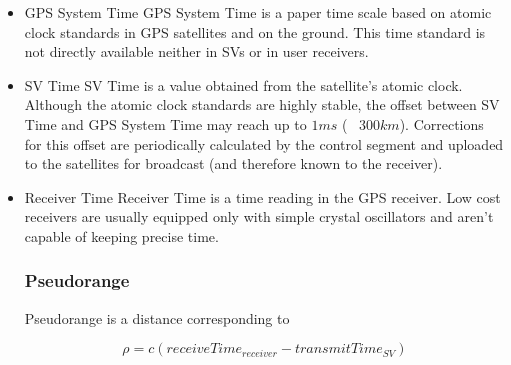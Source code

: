 \begin{itemize}
\item
GPS System Time
GPS System Time is a paper time scale based on atomic clock standards in GPS
satellites and on the ground. This time standard is not directly available
neither in SVs or in user receivers.

\item
SV Time
SV Time is a value obtained from the satellite's atomic clock.
Although the atomic clock standards are highly stable, the offset between SV
Time and GPS System Time may reach up to \(1 ms\) (~ \(300 km\)).
Corrections for this offset are periodically calculated by the control segment
and uploaded to the satellites for broadcast (and therefore known to the
receiver).

\item
Receiver Time
Receiver Time is a time reading in the GPS receiver.
Low cost receivers are usually equipped only with simple crystal oscillators
and aren't capable of keeping precise time.

\subsubsection{Pseudorange}
Pseudorange is a distance corresponding to 

\[\rho = c (receiveTime_{receiver} - transmitTime_{SV})\]





\end{itemize}
